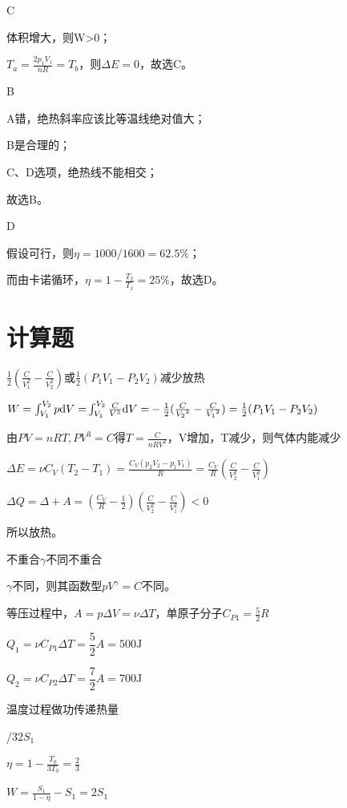 \exercise C

\solve 体积增大，则W>0；

$T_a=\frac{2p_1V_1}{nR}=T_b$，则$\Delta E=0$，故选C。

\exercise B

\solve A错，绝热斜率应该比等温线绝对值大；

B是合理的；

C、D选项，绝热线不能相交；

故选B。

\exercise D

\solve 假设可行，则$\eta=1000/1600=62.5\%$；

而由卡诺循环，$\eta=1-\frac{T_2}{T_1}=25\%$，故选D。

\section{计算题}
\exercise $\frac{1}{2}(\frac{C}{V_1^2}-\frac{C}{V_2^2})$或$\frac{1}{2}(P_1V_1-P_2V_2)$\qquad 减少\qquad 放热

\solve $W = \int_{{V_1}}^{{V_2}} {p\mathrm{d}V = } \int_{V_1}^{V_2}{\frac{C}{{{V^3}}}\mathrm{d}V=}- \frac{1}{2}(\frac{C}{{{V_2}^2}}-\frac{C}{{{V_1}^2}})=\frac{1}{2}(P_1V_1-P_2V_2)$

由$PV = nRT,P{V^3} = C$得$T=\frac{C}{nRV^2}$，V增加，T减少，则气体内能减少

$\Delta E = \nu {C_V}({T_2}-{T_1})= \frac{{{C_V}({p_2}{V_2} - {p_1}{V_1})}}{R} = \frac{C_V}{R}(\frac{C}{V_2^2}-\frac{C}{V_1^2})$

$\Delta Q = \Delta  + A = (\frac{C_V}{R} - \frac{1}{2})(\frac{C}{V_2^2} - \frac{C}{V_1^2}) < 0$

所以放热。

\exercise 不重合\qquad$\gamma$不同\qquad 不重合

\solve
$\gamma$不同，则其函数型$pV^\gamma=C$不同。


\solve 
等压过程中，$A=p\Delta V=\nu \Delta T$，单原子分子$C_{P1}=\frac{5}{2}R$

$Q_1=\nu C_{P1} \Delta T=\dfrac{5}{2}A=500\mathrm{J}$

$Q_2=\nu C_{P2} \Delta T=\dfrac{7}{2}A=700\mathrm{J}$

\exercise 温度\qquad 过程\qquad 做功\qquad 传递热量

/3\qquad$2S_1$

\solve
$\eta =1-\frac{T_0}{3T_0}=\frac{2}{3}$

$W=\frac{S_1}{1-\eta}-S_1=2S_1$

